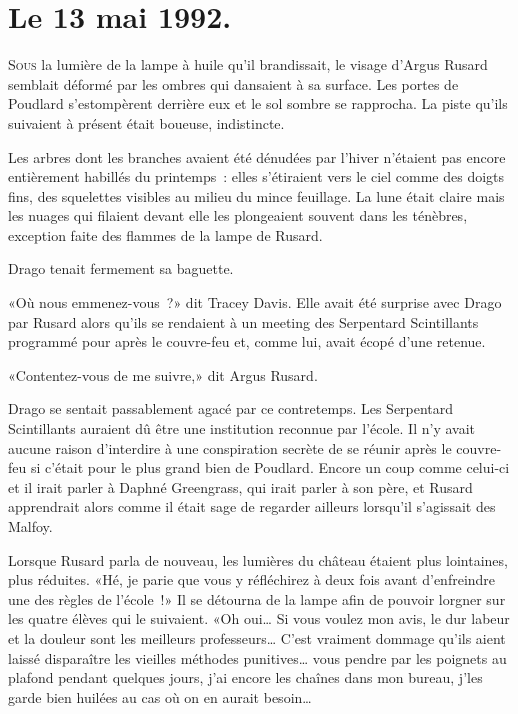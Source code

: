
\section{Le 13 mai 1992.}

\lettrine{S}{ous} la lumière de la lampe à huile qu'il brandissait, le visage d'Argus Rusard semblait déformé par les ombres qui dansaient à sa surface. Les portes de Poudlard s'estompèrent derrière eux et le sol sombre se rapprocha. La piste qu'ils suivaient à présent était boueuse, indistincte.

Les arbres dont les branches avaient été dénudées par l'hiver n'étaient pas encore entièrement habillés du printemps~: elles s'étiraient vers le ciel comme des doigts fins, des squelettes visibles au milieu du mince feuillage. La lune était claire mais les nuages qui filaient devant elle les plongeaient souvent dans les ténèbres, exception faite des flammes de la lampe de Rusard.

Drago tenait fermement sa baguette.

«Où nous emmenez-vous~?» dit Tracey Davis. Elle avait été surprise avec Drago par Rusard alors qu'ils se rendaient à un meeting des Serpentard Scintillants programmé pour après le couvre-feu et, comme lui, avait écopé d'une retenue.

«Contentez-vous de me suivre,» dit Argus Rusard.

Drago se sentait passablement agacé par ce contretemps. Les Serpentard Scintillants auraient dû être une institution reconnue par l'école. Il n'y avait aucune raison d'interdire à une conspiration secrète de se réunir après le couvre-feu si c'était pour le plus grand bien de Poudlard. Encore un coup comme celui-ci et il irait parler à Daphné Greengrass, qui irait parler à son père, et Rusard apprendrait alors comme il était sage de regarder ailleurs lorsqu'il s'agissait des Malfoy.

Lorsque Rusard parla de nouveau, les lumières du château étaient plus lointaines, plus réduites. «Hé, je parie que vous y réfléchirez à deux fois avant d'enfreindre une des règles de l'école~!» Il se détourna de la lampe afin de pouvoir lorgner sur les quatre élèves qui le suivaient. «Oh oui… Si vous voulez mon avis, le dur labeur et la douleur sont les meilleurs professeurs… C'est vraiment dommage qu'ils aient laissé disparaître les vieilles méthodes punitives… vous pendre par les poignets au plafond pendant quelques jours, j'ai encore les chaînes dans mon bureau, j'les garde bien huilées au cas où on en aurait besoin…

